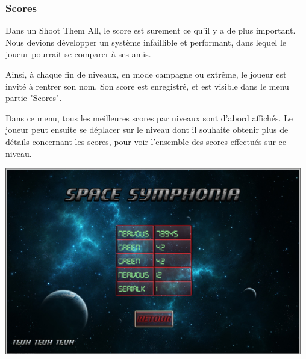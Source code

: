 \subsubsection{Scores}
\par Dans un Shoot Them All, le score est surement ce qu'il y a de plus important. Nous devions développer un système infaillible et performant, dans lequel le joueur pourrait se comparer à ses amis.
\par Ainsi, à chaque fin de niveaux, en mode campagne ou extrême, le joueur est invité à rentrer son nom. Son score est enregistré, et est visible dans le menu partie "Scores". 
\par Dans ce menu, tous les meilleures scores par niveaux sont d'abord affichés. Le joueur peut ensuite se déplacer sur le niveau dont il souhaite obtenir plus de détails concernant les scores, pour voir l'ensemble des scores effectués sur ce niveau.

\begin{center}
	\includegraphics[width=13cm]{images/score1.png}
\end{center}